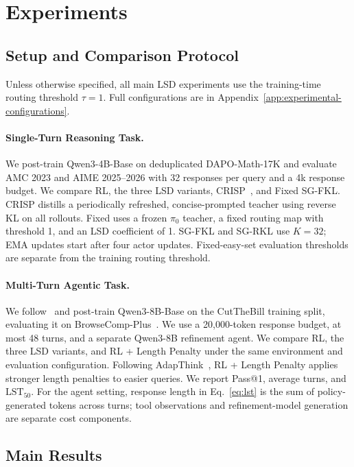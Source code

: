 \section{Experiments}
\label{sec:experiments}

\subsection{Setup and Comparison Protocol}
\label{sec:setup}

Unless otherwise specified, all main LSD experiments use the training-time routing threshold $\tau=1$. Full configurations are in Appendix~\ref{app:experimental-configurations}.

\paragraph{Single-Turn Reasoning Task.}
We post-train Qwen3-4B-Base on deduplicated DAPO-Math-17K and evaluate AMC 2023 and AIME 2025--2026 with 32 responses per query and a 4k response budget. We compare RL, the three LSD variants, CRISP~\citep{sang2026opsdc}, and Fixed SG-FKL. CRISP distills a periodically refreshed, concise-prompted teacher using reverse KL on all rollouts. Fixed uses a frozen $\pi_0$ teacher, a fixed routing map with threshold 1, and an LSD coefficient of 1. SG-FKL and SG-RKL use $K=32$; EMA updates start after four actor updates. Fixed-easy-set evaluation thresholds are separate from the training routing threshold.

\paragraph{Multi-Turn Agentic Task.}
We follow~\citet{wu2025cutbill} and post-train Qwen3-8B-Base on the CutTheBill training split, evaluating it on BrowseComp-Plus~\citep{chen2025browsecomp}. We use a 20,000-token response budget, at most 48 turns, and a separate Qwen3-8B refinement agent. We compare RL, the three LSD variants, and RL + Length Penalty under the same environment and evaluation configuration. Following AdapThink~\citep{xu2026adapthink}, RL + Length Penalty applies stronger length penalties to easier queries. We report Pass@1, average turns, and $\mathrm{LST}_{50}$. For the agent setting, response length in Eq.~\ref{eq:lst} is the sum of policy-generated tokens across turns; tool observations and refinement-model generation are separate cost components.

\subsection{Main Results}
\label{sec:main-results}
\label{sec:single-turn}

